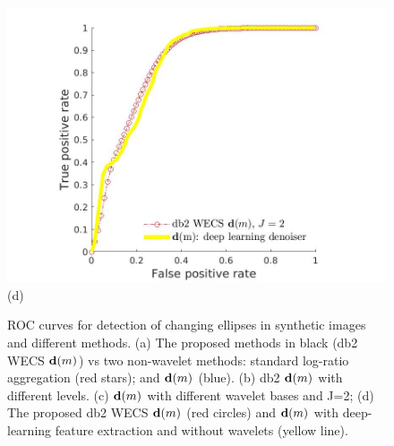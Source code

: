 \documentclass[journal]{IEEEtran}
\newcommand{\vd}{{\textbf d}}
\begin{document}
\begin{figure}[htp!]
\includegraphics[scale=.13]{../../figs/dm_comparison_wavelet_deepL}\hspace{-.5cm}(d) \\
\caption{ROC curves for detection of changing ellipses in synthetic images and different methods. (a) The proposed methods in black (db2 WECS $\vd(m)$) vs two non-wavelet methods: standard log-ratio aggregation (red stars); and $\vd(m)$ (blue).
(b) db2 $\vd(m)$ with different levels.
(c) $\vd(m)$ with different wavelet bases and J=2;
(d) The proposed db2 WECS $\vd(m)$ (red circles) and $\vd(m)$ with deep-learning feature extraction and without wavelets (yellow line).}
\label{F:EllipsoidChanges_details}
\end{figure}
\end{document}
